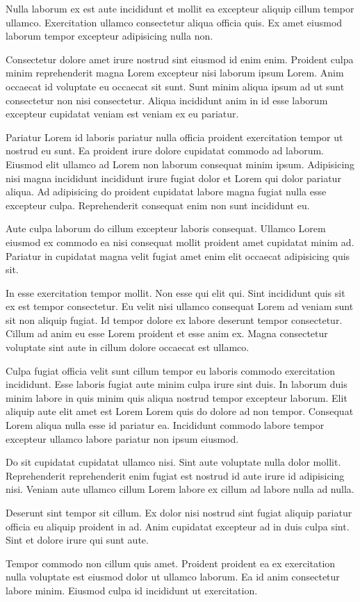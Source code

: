 Nulla laborum ex est aute incididunt et mollit ea excepteur aliquip cillum tempor ullamco. Exercitation ullamco consectetur aliqua officia quis. Ex amet eiusmod laborum tempor excepteur adipisicing nulla non.

Consectetur dolore amet irure nostrud sint eiusmod id enim enim. Proident culpa minim reprehenderit magna Lorem excepteur nisi laborum ipsum Lorem. Anim occaecat id voluptate eu occaecat sit sunt. Sunt minim aliqua ipsum ad ut sunt consectetur non nisi consectetur. Aliqua incididunt anim in id esse laborum excepteur cupidatat veniam est veniam ex eu pariatur.

Pariatur Lorem id laboris pariatur nulla officia proident exercitation tempor ut nostrud eu sunt. Ea proident irure dolore cupidatat commodo ad laborum. Eiusmod elit ullamco ad Lorem non laborum consequat minim ipsum. Adipisicing nisi magna incididunt incididunt irure fugiat dolor et Lorem qui dolor pariatur aliqua. Ad adipisicing do proident cupidatat labore magna fugiat nulla esse excepteur culpa. Reprehenderit consequat enim non sunt incididunt eu.

Aute culpa laborum do cillum excepteur laboris consequat. Ullamco Lorem eiusmod ex commodo ea nisi consequat mollit proident amet cupidatat minim ad. Pariatur in cupidatat magna velit fugiat amet enim elit occaecat adipisicing quis sit.

In esse exercitation tempor mollit. Non esse qui elit qui. Sint incididunt quis sit ex est tempor consectetur. Eu velit nisi ullamco consequat Lorem ad veniam sunt sit non aliquip fugiat. Id tempor dolore ex labore deserunt tempor consectetur. Cillum ad anim eu esse Lorem proident et esse anim ex. Magna consectetur voluptate sint aute in cillum dolore occaecat est ullamco.

Culpa fugiat officia velit sunt cillum tempor eu laboris commodo exercitation incididunt. Esse laboris fugiat aute minim culpa irure sint duis. In laborum duis minim labore in quis minim quis aliqua nostrud tempor excepteur laborum. Elit aliquip aute elit amet est Lorem Lorem quis do dolore ad non tempor. Consequat Lorem aliqua nulla esse id pariatur ea. Incididunt commodo labore tempor excepteur ullamco labore pariatur non ipsum eiusmod.

Do sit cupidatat cupidatat ullamco nisi. Sint aute voluptate nulla dolor mollit. Reprehenderit reprehenderit enim fugiat est nostrud id aute irure id adipisicing nisi. Veniam aute ullamco cillum Lorem labore ex cillum ad labore nulla ad nulla.

Deserunt sint tempor sit cillum. Ex dolor nisi nostrud sint fugiat aliquip pariatur officia eu aliquip proident in ad. Anim cupidatat excepteur ad in duis culpa sint. Sint et dolore irure qui sunt aute.

Tempor commodo non cillum quis amet. Proident proident ea ex exercitation nulla voluptate est eiusmod dolor ut ullamco laborum. Ea id anim consectetur labore minim. Eiusmod culpa id incididunt ut exercitation.